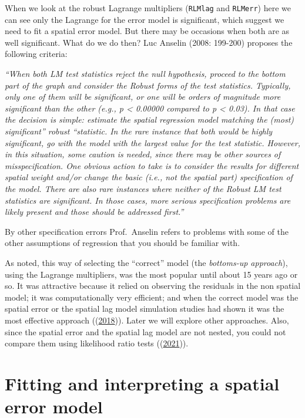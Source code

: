 \documentclass[
  krantz2]{krantz}
\begin{document}
When we look at the robust Lagrange multipliers (\texttt{RLMlag} and \texttt{RLMerr}) here we can see only the Lagrange for the error model is significant, which suggest we need to fit a spatial error model. But there may be occasions when both are as well significant. What do we do then? Luc Anselin (2008: 199-200) proposes the following criteria:

\emph{``When both LM test statistics reject the null hypothesis, proceed to the bottom part of the graph and consider the Robust forms of the test statistics. Typically, only one of them will be significant, or one will be orders of magnitude more significant than the other (e.g., p \textless{} 0.00000 compared to p \textless{} 0.03). In that case the decision is simple: estimate the spatial regression model matching the (most) significant'' robust ``statistic. In the rare instance that both would be highly significant, go with the model with the largest value for the test statistic. However, in this situation, some caution is needed, since there may be other sources of misspecification. One obvious action to take is to consider the results for different spatial weight and/or change the basic (i.e., not the spatial part) specification of the model. There are also rare instances where neither of the Robust LM test statistics are significant. In those cases, more serious specification problems are likely present and those should be addressed first.''}

By other specification errors Prof.~Anselin refers to problems with some of the other assumptions of regression that you should be familiar with.

As noted, this way of selecting the ``correct'' model (the \emph{bottoms-up approach}), using the Lagrange multipliers, was the most popular until about 15 years ago or so. It was attractive because it relied on observing the residuals in the non spatial model; it was computationally very efficient; and when the correct model was the spatial error or the spatial lag model simulation studies had shown it was the most effective approach ((\protect\hyperlink{ref-Floch_2018}{2018})). Later we will explore other approaches. Also, since the spatial error and the spatial lag model are not nested, you could not compare them using likelihood ratio tests ((\protect\hyperlink{ref-Bivand_2021}{2021})).

\hypertarget{fitting-and-interpreting-a-spatial-error-model}{%
\section{Fitting and interpreting a spatial error model}\label{fitting-and-interpreting-a-spatial-error-model}}
\end{document}
